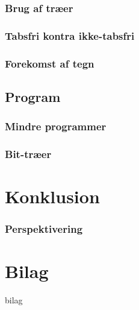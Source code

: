 \documentclass[12pt,a4paper]{report}
\begin{document}
	\subsection{Brug af træer}
	   
   
	\subsection{Tabsfri kontra ikke-tabsfri}
	

	\subsection{Forekomst af tegn}
	

   \section{Program}

	\subsection{Mindre programmer}
	
   
  	 \subsection{Bit-træer}
   	

\chapter{Konklusion}

           

           \subsection{Perspektivering}
	




\chapter*{Bilag}
 {bilag}
\end{document}
